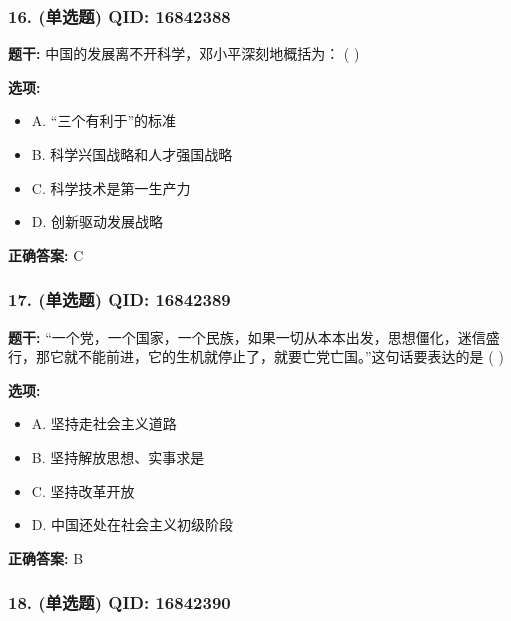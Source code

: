 \documentclass[12pt,UTF8]{ctexart}
\begin{document}
\subsubsection*{16. (单选题) \small QID: 16842388}

\textbf{题干:}
中国的发展离不开科学，邓小平深刻地概括为： ( )

\textbf{选项:}
\begin{itemize}[leftmargin=*]

  \item A. “三个有利于”的标准

  \item B. 科学兴国战略和人才强国战略

  \item C. 科学技术是第一生产力

  \item D. 创新驱动发展战略

\end{itemize}

\textbf{正确答案:}
C

\vspace{0.3em}\hrulefill\vspace{0.7em}

\subsubsection*{17. (单选题) \small QID: 16842389}

\textbf{题干:}
“一个党，一个国家，一个民族，如果一切从本本出发，思想僵化，迷信盛行，那它就不能前进，它的生机就停止了，就要亡党亡国。”这句话要表达的是 ( )

\textbf{选项:}
\begin{itemize}[leftmargin=*]

  \item A. 坚持走社会主义道路

  \item B. 坚持解放思想、实事求是

  \item C. 坚持改革开放

  \item D. 中国还处在社会主义初级阶段

\end{itemize}

\textbf{正确答案:}
B

\vspace{0.3em}\hrulefill\vspace{0.7em}

\subsubsection*{18. (单选题) \small QID: 16842390}
\end{document}
